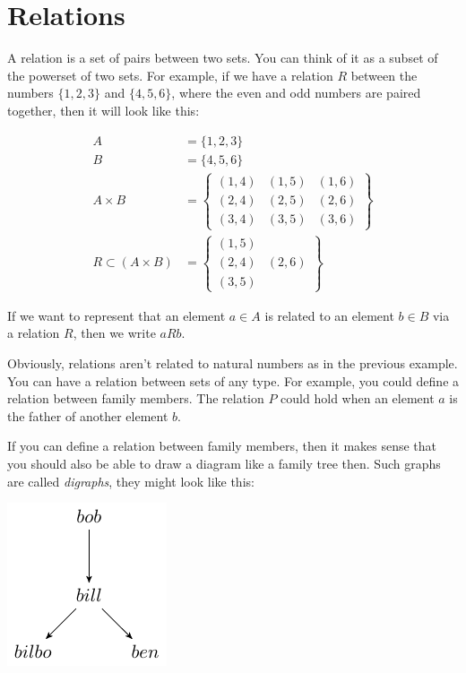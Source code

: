 \section{Relations}

A relation is a set of pairs between two sets. You can think of it as a subset
of the powerset of two sets. For example, if we have a relation $R$ between the
numbers $\{1,2,3\}$ and $\{4,5,6\}$, where the even and odd numbers are paired
together, then it will look like this:

\[
	\begin{split}
		A &= \{1,2,3\}\\
		B &= \{4,5,6\}\\
		A \times B &= \begin{Bmatrix}
						(1,4)&(1,5)&(1,6)\\
						(2,4)&(2,5)&(2,6)\\
						(3,4)&(3,5)&(3,6)
					  \end{Bmatrix}\\
		R \subset (A \times B) &= \begin{Bmatrix}
									(1,5)\\
									(2,4)&(2,6)\\
									(3,5)
								 \end{Bmatrix}
	\end{split}
\]

If we want to represent that an element $a \in A$ is related to an element $b
\in B$ via a relation $R$, then we write $aRb$.

Obviously, relations aren't related to natural numbers as in the previous
example. You can have a relation between sets of any type. For example, you
could define a relation between family members. The relation $P$ could hold when
an element $a$ is the father of another element $b$.

If you can define a relation between family members, then it makes sense that
you should also be able to draw a diagram like a family tree then. Such graphs
are called {\it digraphs}, they might look like this:

\begin{center}
  \includegraphics{digraphs/1.pdf}
\end{center}

